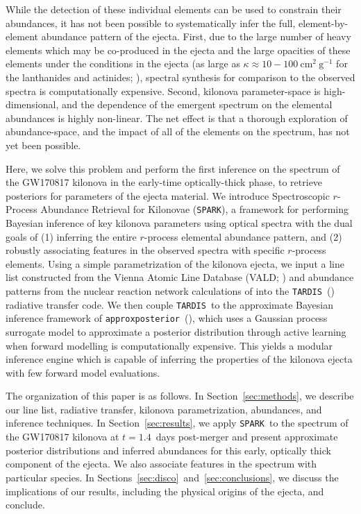 \documentclass[twocolumn, twocolappendix]{aastex63}
\def\SPARK{\texttt{SPARK}}
\def\TARDIS{\texttt{TARDIS}}
\def\approxposterior{\texttt{approxposterior}}
\begin{document}
While the detection of these individual elements can be used to constrain their abundances, it has not been possible to systematically infer the full, element-by-element abundance pattern of the ejecta. First, due to the large number of heavy elements which may be co-produced in the ejecta and the large opacities of these elements under the conditions in the ejecta (as large as $\kappa \approx 10 - 100 ~\mathrm{cm^2~g^{-1}}$ for the lanthanides and actinides; \citealt{kasen13, kasen17, even20, fontes20, tanaka20, silva22}), spectral synthesis for comparison to the observed spectra is computationally expensive. Second, kilonova parameter-space is high-dimensional, and the dependence of the emergent spectrum on the elemental abundances is highly non-linear. The net effect is that a thorough exploration of abundance-space, and the impact of all of the elements on the spectrum, has not yet been possible.

Here, we solve this problem and perform the first inference on the spectrum of the GW170817 kilonova in the early-time optically-thick phase, to retrieve posteriors for parameters of the ejecta material. We introduce Spectroscopic $r$-Process Abundance Retrieval for Kilonovae (\SPARK), a framework for performing Bayesian inference of key kilonova parameters using optical spectra with the dual goals of (1) inferring the entire $r$-process elemental abundance pattern, and (2) robustly associating features in the observed spectra with specific $r$-process elements. Using a simple parametrization of the kilonova ejecta, we input a line list constructed from the Vienna Atomic Line Database (VALD; \citealt{ryabchikova15, pakhomov19}) and abundance patterns from the nuclear reaction network calculations of \cite{wanajo18} into the \TARDIS~(\citealt{kerzendorf14}) radiative transfer code. We then couple \TARDIS~to the approximate Bayesian inference framework of \approxposterior~(\citealt{fleming18, fleming20}), which uses a Gaussian process surrogate model to approximate a posterior distribution through active learning when forward modelling is computationally expensive. This yields a modular inference engine which is capable of inferring the properties of the kilonova ejecta with few forward model evaluations.

The organization of this paper is as follows. In Section~\ref{sec:methods}, we describe our line list, radiative transfer, kilonova parametrization, abundances, and inference techniques. In Section~\ref{sec:results}, we apply \SPARK~to the spectrum of the GW170817 kilonova at $t = 1.4$~days post-merger and present approximate posterior distributions and inferred abundances for this early, optically thick component of the ejecta. We also associate features in the spectrum with particular species. In Sections~\ref{sec:disco}~and~\ref{sec:conclusions}, we discuss the implications of our results, including the physical origins of the ejecta, and conclude.
\end{document}
